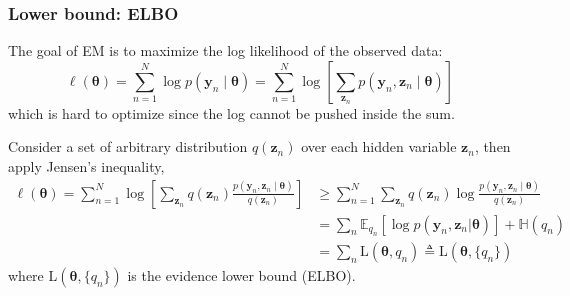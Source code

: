 \documentclass[11pt]{article}
\begin{document}
\subsubsection*{Lower bound: ELBO}
The goal of EM is to maximize the log likelihood of the observed data:
\[
\ell(\boldsymbol{\theta}) = \sum_{n=1}^{N} \log p(\boldsymbol{y}_n \mid \boldsymbol{\theta}) = \sum_{n=1}^{N} \log \left[ \sum_{\boldsymbol{z}_n} p(\boldsymbol{y}_n, \boldsymbol{z}_n \mid \boldsymbol{\theta}) \right]
\]
which is hard to optimize since the log cannot be pushed inside the sum.

Consider a set of arbitrary distribution $q(\boldsymbol{z}_n)$ over each hidden variable $\boldsymbol{z}_n$, then apply Jensen's inequality,
\[
\begin{aligned}
\ell (\boldsymbol{\theta}) = \sum_{n=1}^{N} \log \left[ \sum_{\boldsymbol{z}_n} q(\boldsymbol{z}_n) \frac{p(\boldsymbol{y}_n, \boldsymbol{z}_n \mid \boldsymbol{\theta})}{q(\boldsymbol{z}_n)} \right]
&\geq \sum_{n=1}^{N} \sum_{\boldsymbol{z}_n} q(\boldsymbol{z}_n) \log \frac{p(\boldsymbol{y}_n, \boldsymbol{z}_n \mid \boldsymbol{\theta})}{q(\boldsymbol{z}_n)} \\
&= \sum_n \mathbb{E}_{q_n} \left[ \log p(\boldsymbol{y}_n, \boldsymbol{z}_n | \boldsymbol{\theta}) \right] + \mathbb{H}(q_n) \\
&= \sum_n \text{L}(\boldsymbol{\theta}, q_n) \triangleq \text{L}(\boldsymbol{\theta}, \{q_n\})
\end{aligned}
\]
where $\text{L}(\boldsymbol{\theta}, \{q_n\})$ is the evidence lower bound (ELBO).
\end{document}
